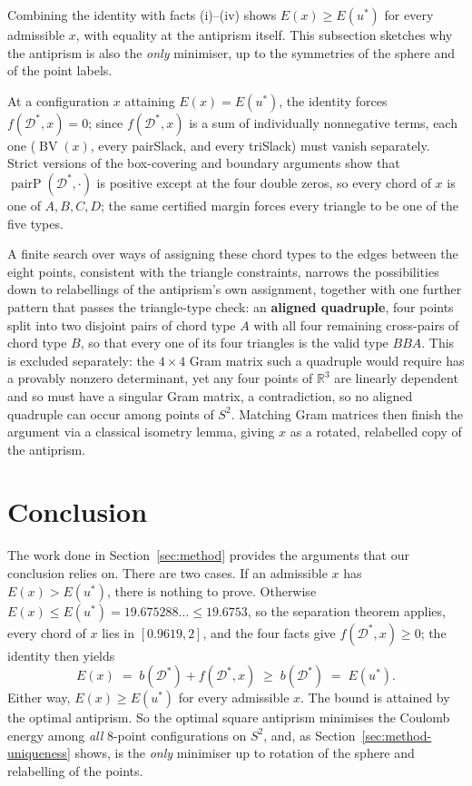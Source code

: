 \documentclass[11pt]{article}
\theoremstyle{definition}
\theoremstyle{remark}
\newcommand{\RR}{\mathbb{R}}
\newcommand{\energy}{E}
\newcommand{\pairP}{\operatorname{pairP}}
\newcommand{\BV}{\operatorname{BV}}
\begin{document}
Combining the identity with facts (i)--(iv) shows $\energy(x)\ge\energy(u^*)$
for every admissible $x$, with equality at the antiprism itself. This
subsection sketches why the antiprism is also the \emph{only} minimiser,
up to the symmetries of the sphere and of the point labels.

At a configuration $x$ attaining $\energy(x)=\energy(u^*)$, the identity
forces $f(\mathcal{D}^*,x)=0$; since $f(\mathcal{D}^*,x)$ is a sum of individually
nonnegative terms, each one
($\BV(x)$, every pairSlack, and every triSlack) must vanish
separately. Strict versions of the box-covering and boundary arguments
show that $\pairP(\mathcal{D}^*,\cdot)$ is positive except at the four
double zeros, so every chord of $x$ is one of $A,B,C,D$; the same
certified margin forces every triangle to be one of the five types.

A finite search over ways of assigning these chord types to the edges
between the eight points, consistent with the triangle constraints,
narrows the possibilities down to relabellings of the antiprism's own
assignment, together with one further pattern that passes the
triangle-type check: an \textbf{aligned quadruple}, four points split into two
disjoint pairs of chord type $A$ with all four remaining cross-pairs of
chord type $B$, so that every one of its four triangles is the valid
type $BBA$. This is excluded separately: the $4\times4$ Gram matrix
such a quadruple would require has a provably nonzero determinant, yet
any four points of $\RR^3$ are linearly dependent and so must have a
singular Gram matrix, a contradiction, so no aligned quadruple can
occur among points of $S^2$. Matching Gram matrices then finish
the argument via a classical isometry lemma, giving $x$ as a rotated,
relabelled copy of the antiprism.

\section{Conclusion}
\label{sec:conclusion}

The work done in Section~\ref{sec:method} provides the arguments that our conclusion relies on.
There are two cases. If an
admissible $x$ has $\energy(x)>\energy(u^*)$, there is nothing to prove.
Otherwise $\energy(x)\le\energy(u^*)=19.675288\ldots\le19.6753$, so the
separation theorem applies, every chord of $x$ lies in $[0.9619,2]$, and
the four facts give $f(\mathcal{D}^*,x)\ge0$; the identity then yields
\begin{equation}
  \energy(x) \;=\; b(\mathcal{D}^*) + f(\mathcal{D}^*,x) \;\ge\; b(\mathcal{D}^*) \;=\; \energy(u^*).
\end{equation}
Either way, $\energy(x)\ge\energy(u^*)$ for every admissible $x$. The
bound is attained by the optimal antiprism. So the optimal square
antiprism minimises the Coulomb energy among \emph{all}
$8$-point configurations on $S^2$, and, as Section~\ref{sec:method-uniqueness}
shows, is the \emph{only} minimiser up to rotation of the sphere and
relabelling of the points.
\end{document}
